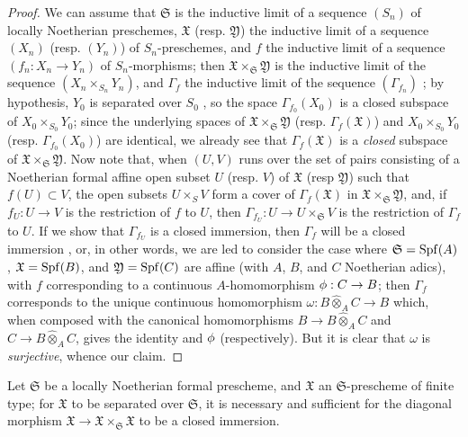 \begin{proof}
We can assume that $\mathfrak{S}$ is the inductive limit of a sequence $(S_n)$ of locally Noetherian preschemes, $\mathfrak{X}$ (resp. $\mathfrak{Y}$) the inductive limit of a sequence $(X_n)$ (resp. $(Y_n)$) of $S_n$-preschemes, and $f$ the inductive limit of a sequence $(f_n:X_n\to Y_n)$ of $S_n$-morphisms;
then $\mathfrak{X}\times_\mathfrak{S}\mathfrak{Y}$ is the inductive limit of the sequence $(X_n\times_{S_n}Y_n)$, and $\Gamma_f$ the inductive limit of the sequence $(\Gamma_{f_n})$ ;
by hypothesis, $Y_0$ is separated over $S_0$ , so the space $\Gamma_{f_0}(X_0)$ is a closed subspace of $X_0\times_{S_0}Y_0$;
since the underlying spaces of $\mathfrak{X}\times_\mathfrak{S}\mathfrak{Y}$ (resp. $\Gamma_f(\mathfrak{X})$) and $X_0\times_{S_0}Y_0$ (resp. $\Gamma_{f_0}(X_0)$) are identical, we already see that $\Gamma_f(\mathfrak{X})$ is a \emph{closed} subspace of $\mathfrak{X}\times_\mathfrak{S}\mathfrak{Y}$.
Now note that, when $(U,V)$ runs over the set of pairs consisting of a Noetherian formal affine open subset $U$ (resp. $V$) of $\mathfrak{X}$ (resp $\mathfrak{Y}$) such that $f(U)\subset V$, the open subsets $U\times_S V$ form a cover of $\Gamma_f(\mathfrak{X})$ in $\mathfrak{X}\times_\mathfrak{S}\mathfrak{Y}$, and, if $f_U:U\to V$ is the restriction of $f$ to $U$, then $\Gamma_{f_U}:U\to U\times_\mathfrak{S}V$ is the restriction of $\Gamma_f$ to $U$.
If we show that $\Gamma_{f_U}$ is a closed immersion, then $\Gamma_f$ will be a closed immersion , or, in other words, we are led to consider the case where $\mathfrak{S}=\operatorname{Spf}(A)$, $\mathfrak{X}=\operatorname{Spf}(B)$, and $\mathfrak{Y}=\operatorname{Spf}(C)$ are affine (with $A$, $B$, and $C$ Noetherian adics), with $f$ corresponding to a continuous $A$-homomorphism $\vphi:C\to B$;
then $\Gamma_f$ corresponds to the unique continuous homomorphism $\omega: B\widehat{\otimes}_A C\to B$ which, when composed with the canonical homomorphisms $B\to B\widehat{\otimes}_A C$ and $C\to B\widehat{\otimes}_A C$, gives the identity and $\phi$ (respectively).
But it is clear that $\omega$ is \emph{surjective}, whence our claim.
\end{proof}

\begin{corollary}[10.15.5]
\label{I.10.15.5}
Let $\mathfrak{S}$ be a locally Noetherian formal prescheme, and $\mathfrak{X}$ an $\mathfrak{S}$-prescheme of finite type;
for $\mathfrak{X}$ to be separated over $\mathfrak{S}$, it is necessary and sufficient for the diagonal morphism $\mathfrak{X}\to\mathfrak{X}\times_\mathfrak{S}\mathfrak{X}$ to be a closed immersion.
\end{corollary}

